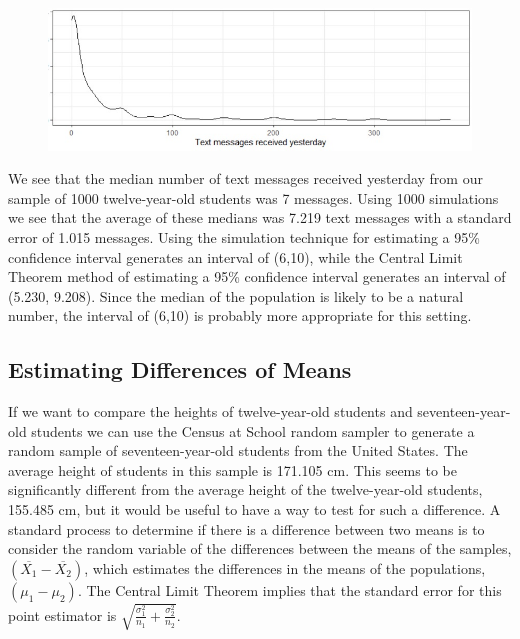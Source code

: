 \documentclass[
]{book}
\theoremstyle{definition}
\theoremstyle{definition}
\theoremstyle{definition}
\theoremstyle{definition}
\theoremstyle{remark}
\begin{document}
\begin{figure}

{\centering \includegraphics[width=0.6\linewidth]{images/texts_received_dist} 

}

\end{figure}

We see that the median number of text messages received yesterday from our sample of 1000 twelve-year-old students was 7 messages. Using 1000 simulations we see that the average of these medians was 7.219 text messages with a standard error of 1.015 messages. Using the simulation technique for estimating a 95\% confidence interval generates an interval of (6,10), while the Central Limit Theorem method of estimating a 95\% confidence interval generates an interval of (5.230, 9.208). Since the median of the population is likely to be a natural number, the interval of (6,10) is probably more appropriate for this setting.

\hypertarget{estimating-differences-of-means}{%
\subsection{Estimating Differences of Means}\label{estimating-differences-of-means}}

If we want to compare the heights of twelve-year-old students and seventeen-year-old students we can use the Census at School random sampler to generate a random sample of seventeen-year-old students from the United States. The average height of students in this sample is 171.105 cm. This seems to be significantly different from the average height of the twelve-year-old students, 155.485 cm, but it would be useful to have a way to test for such a difference. A standard process to determine if there is a difference between two means is to consider the random variable of the differences between the means of the samples, \((\overline{X_1} - \overline{X_2})\), which estimates the differences in the means of the populations, \((\mu_1-\mu_2)\). The Central Limit Theorem implies that the standard error for this point estimator is \(\displaystyle{\sqrt{ \frac{\sigma_1^2}{n_1} + \frac{\sigma_2^2}{n_2}}}\).
\end{document}
